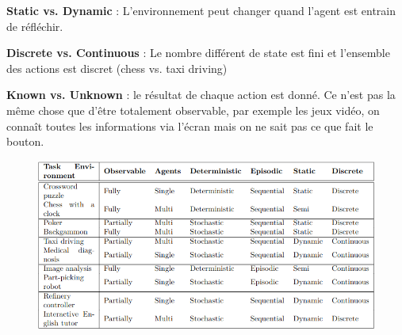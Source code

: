 	\textbf{Static vs. Dynamic} : L'environnement peut changer quand l'agent est entrain de réfléchir.
	
	\textbf{Discrete vs. Continuous} : Le nombre différent de state est fini et l'ensemble des actions est discret (chess vs. taxi driving)
	
	\textbf{Known vs. Unknown} : le résultat de chaque action est donné. Ce n'est pas la même chose que d'être totalement observable, par exemple les jeux vidéo, on connaît toutes les informations via l'écran mais on ne sait pas ce que fait le bouton.
	
	\begin{figure}[H]
		\centering
		\includegraphics[width=\textwidth]{img/PEASexemple2.png}
	\end{figure}